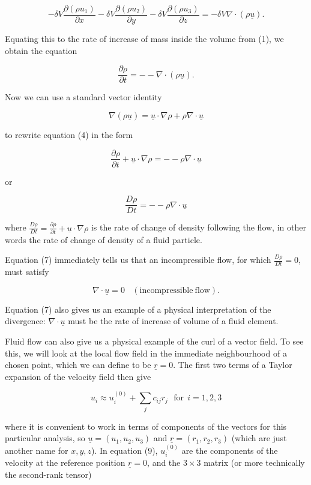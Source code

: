   $$-\delta V \dfrac{\partial (\rho u_1)}{\partial x} -\delta V \dfrac{\partial 
  (\rho u_2)}{\partial y} -\delta V \dfrac{\partial (\rho u_3)}{\partial z} = 
  -\delta V \nabla \cdot (\rho \underline{u}) . \tag{3}$$ 

  Equating this to the rate of increase of mass inside the volume from (1), we 
  obtain the equation 

  $$\dfrac{\partial \rho}{\partial t} = -- \nabla \cdot (\rho \underline{u}) . 
  \tag{4}$$ 

  Now we can use a standard vector identity 

  $$\nabla (\rho \underline{u}) = \underline{u} \cdot \nabla \rho + \rho \nabla 
  \cdot \underline{u}\tag{5}$$ 

  to rewrite equation (4) in the form 

  $$\dfrac{\partial \rho}{\partial t} + \underline{u} \cdot \nabla \rho = -- 
  \rho \nabla \cdot \underline{u}\tag{6}$$ 

  or 

  $$\dfrac{D \rho}{D t} = -- \rho \nabla \cdot \underline{u}\tag{7}$$ 

  where $\frac{D\rho}{Dt} = \frac{\partial \rho}{\partial t} + \underline{u} 
  \cdot \nabla \rho$ is the rate of change of density following the flow, in 
  other words the rate of change of density of a fluid particle. 

  Equation (7) immediately tells us that an incompressible flow, for which 
  $\frac{D\rho}{Dt} =0$, must satisfy 

  $$\nabla \cdot \underline{u} = 0 \mathrm{~~~~(incompressible~flow)} . 
  \tag{8}$$ 

  Equation (7) also gives us an example of a physical interpretation of the 
  divergence: $\nabla \cdot \underline{u}$ must be the rate of increase of 
  volume of a fluid element. 

  Fluid flow can also give us a physical example of the curl of a vector field. 
  To see this, we will look at the local flow field in the immediate 
  neighbourhood of a chosen point, which we can define to be $\underline{r}=0$. 
  The first two terms of a Taylor expansion of the velocity field then give 

  $$u_i \approx u_i^{(0)} + \sum_j{c_{ij} r_j} \mathrm{~~~for~~}i=1,2,3 
  \tag{9}$$ 

  where it is convenient to work in terms of components of the vectors for this 
  particular analysis, so $\underline{u} = (u_1,u_2,u_3)$ and 
  $\underline{r}=(r_1,r_2,r_3)$ (which are just another name for $x,y,z$). In 
  equation (9), $u_i^{(0)}$ are the components of the velocity at the reference 
  position $\underline{r}=0$, and the $3 \times 3$ matrix (or more technically 
  the second-rank tensor) 

